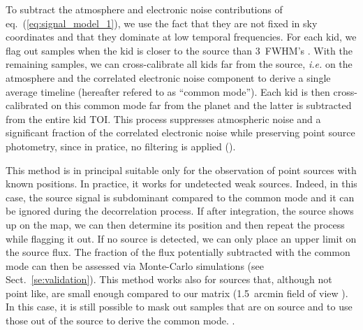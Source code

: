 To subtract the atmosphere and electronic noise contributions of
eq.~(\ref{eq:signal_model_1}), we use the fact that they are not fixed in sky
coordinates and that they dominate at low temporal frequencies. For each kid, we
flag out samples when the kid is closer to the source than 3~FWHM's . With the remaining samples, we can cross-calibrate all kids far from the
source, {\it i.e.} on the atmosphere and the correlated electronic noise
component to derive a single average timeline (hereafter refered to as ``common
mode''). Each kid is then cross-calibrated on this common mode far from the
planet and the latter is subtracted from the entire kid TOI. This process
suppresses atmospheric noise and a significant fraction of the correlated
electronic noise while preserving point source photometry, since in pratice, no
filtering is applied ().

This method is in principal suitable only for the observation of point sources
with known positions. In practice, it works for undetected weak sources. Indeed,
in this case, the source signal is subdominant compared to the common mode and
it can be ignored during the decorrelation process. If after integration, the
source shows up on the map, we can then determine its position and then repeat
the process while flagging it out. If no source is detected, we can only place
an upper limit on the source flux. The fraction of the flux potentially
subtracted with the common mode can then be assessed via Monte-Carlo simulations
(see Sect.~\ref{se:validation}). This method works also for sources that,
although not point like, are small enough compared to our matrix (1.5~arcmin
field of view ). In this case, it is still possible to mask
out samples that are on source and to use those out of the source to
derive the common mode. .
